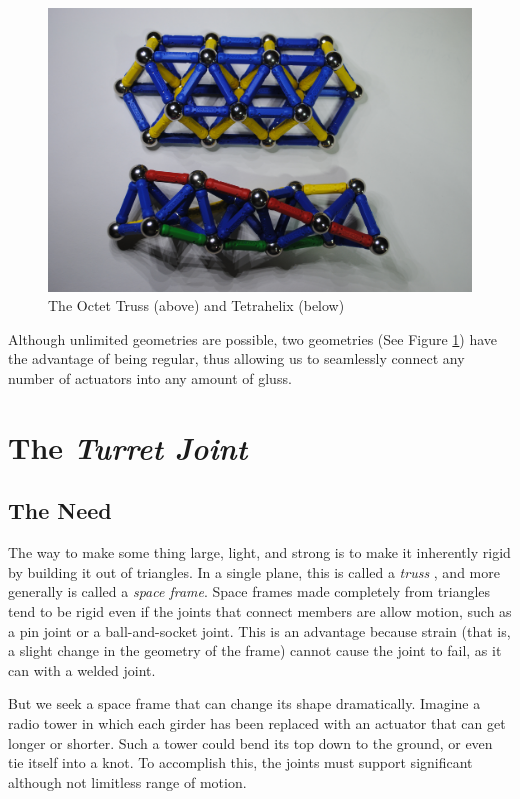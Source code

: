 \documentclass[11pt]{article}
\begin{document}
\begin{figure}[!ht]
  \centering
    \includegraphics[width=1.0\textwidth]{TwoGeometries.jpg}
    \caption[The Octet Truss (above) and Tetrahelix (below)]{The Octet Truss (above) and Tetrahelix (below)}
      \label{twogeometries}
\end{figure}


Although unlimited geometries are possible, two geometries (See Figure \ref{twogeometries}) 
have the advantage of being regular, thus allowing us to
seamlessly connect any number of actuators into any amount of gluss.

\section{The \textit{Turret Joint}}

\subsection{The Need}

The way to make some thing large, light, and strong is to make it inherently rigid by building it
out of triangles. In a single plane, this is called a \emph{truss} \cite{ambrose1993building}, and more generally is called
a \emph{space frame}.  Space frames made completely from triangles tend to be rigid even if the
joints that connect members are allow motion, such as a pin joint or a ball-and-socket joint. This
is an advantage because strain (that is, a slight change in the geometry of the frame) cannot cause
the joint to fail, as it can with a welded joint.

But we seek a space frame that can change its shape dramatically. Imagine a radio tower in which
each girder has been replaced with an actuator that can get longer or shorter. Such a tower could
bend its top down to the ground, or even
tie itself into a knot. To accomplish this, the joints must support significant although not
limitless range of motion. 
\end{document}
